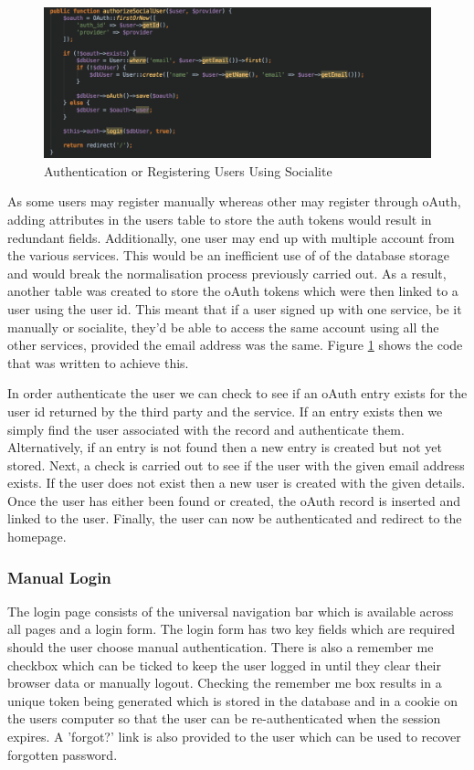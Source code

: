 \begin{figure}[H]
	\centering
	\includegraphics[width=1.0\textwidth]{images/Code/Socialite_Authorise}
	\caption{Authentication or Registering Users Using Socialite} \label{fig:Socialite_Authorise}
\end{figure}

As some users may register manually whereas other may register through oAuth, adding attributes in the users table to store the auth tokens would result in redundant fields. Additionally, one user may end up with multiple account from the various services. This would be an inefficient use of of the database storage and would break the normalisation process previously carried out. As a result, another table was created to store the oAuth tokens which were then linked to a user using the user id. This meant that if a user signed up with one service, be it manually or socialite, they'd be able to access the same account using all the other services, provided the email address was the same. Figure \ref{fig:Socialite_Authorise} shows the code that was written to achieve this. 

In order authenticate the user we can check to see if an oAuth entry exists for the user id returned by the third party and the service. If an entry exists then we simply find the user associated with the record and authenticate them. Alternatively, if an entry is not found then a new entry is created but not yet stored. Next, a check is carried out to see if the user with the given email address exists. If the user does not exist then a new user is created with the given details. Once the user has either been found or created, the oAuth record is inserted and linked to the user. Finally, the user can now be authenticated and redirect to the homepage.

\subsubsection{Manual Login}
The login page consists of the universal navigation bar which is available across all pages and a login form. The login form has two key fields which are required should the user choose manual authentication. There is also a remember me checkbox which can be ticked to keep the user logged in until they clear their browser data or manually logout. Checking the remember me box results in a unique token being generated which is stored in the database and in a cookie on the users computer so that the user can be re-authenticated when the session expires. A 'forgot?' link is also provided to the user which can be used to recover forgotten password.

